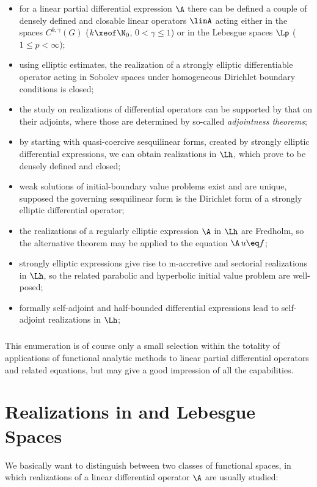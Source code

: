 \documentclass[11pt,twoside]{article}
\def\G{G}
\begin{document}
\begin{itemize}[leftmargin=2mm,itemsep=4pt]
\item[-] 
for a linear partial differential expression $\A$
there can be defined a couple of densely defined and closable linear operators
$\linA$ acting either in the {\HOELDER} spaces $C^{k,\gamma}(\G)$
($k \xeof \N_0$, $0 < \gamma \leq 1$)
or in the Lebesgue spaces $\Lp$ ($1 \leq p < \infty$);

\item[-] 
using elliptic estimates,
the realization of a strongly elliptic differentiable operator
acting in Sobolev spaces
under homogeneous Dirichlet boundary conditions is closed;

\item[-] 
the study on realizations of differential operators can be supported
by that on their adjoints,
where those are determined by so-called \textit{adjointness theorems};

\item[-] 
by starting with quasi-coercive sesquilinear forms,
created by strongly elliptic differential expressions,
we can obtain realizations in $\Lh$,
which prove to be densely defined and closed;

\item[-] 
weak solutions of initial-boundary value problems exist and are unique,
supposed the governing sesquilinear form is the Dirichlet form
of a strongly elliptic differential operator;

\item[-] 
the realizations of a regularly elliptic expression $\A$ in $\Lh$ are Fredholm,
so the alternative theorem may be applied to the equation $\A \, u \eq f$;

\item[-] 
strongly elliptic expressions give rise to m-accretive and 
sectorial realizations in $\Lh$,
so the related parabolic and hyperbolic initial value problem are well-posed;

\item[-] 
formally self-adjoint and half-bounded differential expressions
lead to self-adjoint realizations in $\Lh$;
\end{itemize}

\subparagraph{}
This enumeration is of course only a small selection 
within the totality of applications of functional analytic methods
to linear partial differential operators and related equations,
but may give a good impression of all the capabilities.

\section{Realizations in {\HOELDER} and Lebesgue Spaces}
We basically want to distinguish between two classes of functional spaces,
in which realizations of a linear differential operator $\A$
are usually studied:
\end{document}
